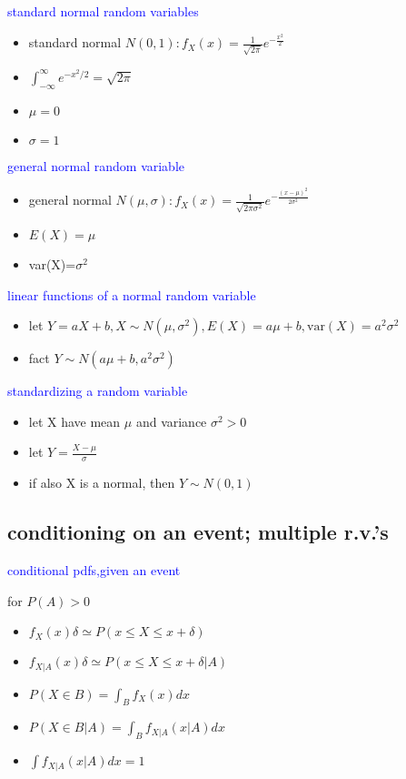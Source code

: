 \textcolor{blue}{standard normal random variables}

\begin{itemize}
    \item standard normal $N(0,1):f_X(x)=\frac{1}{\sqrt{2\pi}}e^{-\frac{x^2}{2}}$
    \item $\int_{-\infty}^\infty e^{-x^2/2}=\sqrt{2\pi}$ 
    \item $\mu=0$
    \item $\sigma=1$
\end{itemize}


\textcolor{blue}{general normal random variable}
\begin{itemize}
    \item general normal $N(\mu,\sigma):f_X(x)=\frac{1}{\sqrt{2\pi\sigma^2}}e^{-\frac{(x-\mu)^2}{2\sigma^2}}$
    \item $E(X)=\mu$
    \item var(X)=$\sigma^2$ 
\end{itemize}


\textcolor{blue}{linear functions of a normal random variable}

\begin{itemize}
    \item let $Y=a X +b, X\sim N(\mu,\sigma^2),E(X)=a \mu +b,\text{var}(X)=a^2\sigma^2$
    \item fact $Y\sim N(a\mu+b,a^2\sigma^2)$
\end{itemize}


\textcolor{blue}{standardizing a random variable}

\begin{itemize}
    \item let X have mean $\mu$ and variance $\sigma^2 >0$
    \item  let $Y=\frac{X-\mu}{\sigma}$
    \item if also X is a normal, then $Y\sim N(0,1)$
\end{itemize}

\subsection*{conditioning on an event; multiple r.v.'s}

\textcolor{blue}{conditional pdfs,given an event}

for $P(A)>0$
\begin{itemize}
    \item $f_X(x)\delta \simeq P(x\le X \le x+\delta)$
    \item $f_{X|A}(x)\delta \simeq P(x\le X \leq x+\delta |A)$
    \item $P(X\in B)=\int_B f_X(x)dx$
    \item $P(X\in B|A)=\int_B f_{X|A}(x|A)dx$
    \item $\int f_{X|A}(x|A)dx=1$
\end{itemize}


